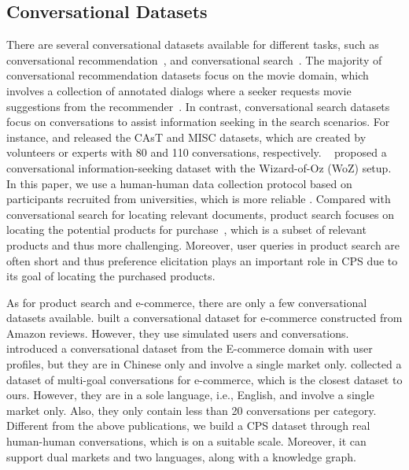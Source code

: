 \subsection{Conversational Datasets}
There are several conversational datasets available for different tasks, such as conversational recommendation~\cite{moon2020situated,saha2018towards,wu2022state}, and conversational search~\cite{ren2021wizard}. The majority of conversational recommendation datasets focus on the movie domain, which involves a collection of annotated dialogs where a seeker requests movie suggestions from the recommender~\cite{zhou2020towards,li2018towards,liu2021durecdial}. In contrast, conversational search datasets~\cite{ren2021wizard,qu2018analyzing,nguyen2016ms,dalton2020cast,mcdumisc,aliannejadi2019asking,zamani2020mimics,aliannejadi2020convai3,chu2022convsearch,trippas2020towards,liao2021mmconv} focus on conversations to assist information seeking in the search scenarios. For instance, \citet{dalton2020cast} and \citet{thomas2017misc} released the CAsT and MISC datasets, which are created by volunteers or experts with 80 and 110 conversations, respectively. %
~\citet{ren2021wizard} proposed a conversational information-seeking dataset with the Wizard-of-Oz (WoZ) setup. In this paper, we use a human-human data collection protocol based on participants recruited from universities, which is more reliable \cite{bernard2023mg}. 
Compared with conversational search for locating relevant documents, product search focuses on locating the potential products for purchase~\cite{wu2018turning,ai2017learning}, which is a subset of relevant products and thus more challenging. Moreover, user queries in product search are often short and thus preference elicitation plays an important role in \ac{CPS} due to its goal of locating the purchased products. 

As for product search and e-commerce, there are only a few conversational datasets available. \citet{fu2020cookie} built a conversational dataset for e-commerce constructed from Amazon reviews. However, they use simulated users and conversations. \citet{jia2022convrec} introduced a conversational dataset from the E-commerce domain with user profiles, but they are in Chinese only and involve a single market only. \citet{bernard2023mg} collected a dataset of multi-goal conversations for e-commerce, which is the closest dataset to ours. However, they are in a sole language, i.e., English, and involve a single market only. Also, they only contain less than 20 conversations per category. Different from the above publications, we build a \ac{CPS} dataset through real human-human conversations, which is on a suitable scale. Moreover, it can support dual markets and two languages, along with a knowledge graph.

